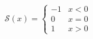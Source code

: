 \begin{gather}
  \mathcal{S}(x) =
  \begin{cases}
    -1 & x < 0 \\
     0 & x = 0 \\
     1 & x > 0
  \end{cases}
\end{gather}